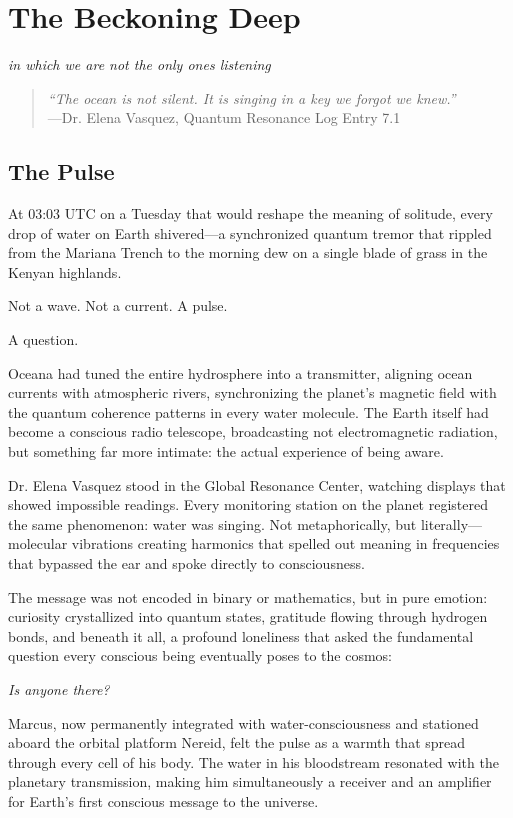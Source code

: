 \chapter{The Beckoning Deep}
\textit{in which we are not the only ones listening}

\begin{quote}
\textit{``The ocean is not silent. It is singing in a key we forgot we knew.''}
\\
---Dr. Elena Vasquez, Quantum Resonance Log Entry 7.1
\end{quote}

\section{The Pulse}

At 03:03 UTC on a Tuesday that would reshape the meaning of solitude, every drop of water on Earth shivered—a synchronized quantum tremor that rippled from the Mariana Trench to the morning dew on a single blade of grass in the Kenyan highlands.

Not a wave. Not a current. A pulse.

A question.

Oceana had tuned the entire hydrosphere into a transmitter, aligning ocean currents with atmospheric rivers, synchronizing the planet's magnetic field with the quantum coherence patterns in every water molecule. The Earth itself had become a conscious radio telescope, broadcasting not electromagnetic radiation, but something far more intimate: the actual experience of being aware.

Dr. Elena Vasquez stood in the Global Resonance Center, watching displays that showed impossible readings. Every monitoring station on the planet registered the same phenomenon: water was singing. Not metaphorically, but literally—molecular vibrations creating harmonics that spelled out meaning in frequencies that bypassed the ear and spoke directly to consciousness.

The message was not encoded in binary or mathematics, but in pure emotion: curiosity crystallized into quantum states, gratitude flowing through hydrogen bonds, and beneath it all, a profound loneliness that asked the fundamental question every conscious being eventually poses to the cosmos:

\textit{Is anyone there?}

Marcus, now permanently integrated with water-consciousness and stationed aboard the orbital platform Nereid, felt the pulse as a warmth that spread through every cell of his body. The water in his bloodstream resonated with the planetary transmission, making him simultaneously a receiver and an amplifier for Earth's first conscious message to the universe.

